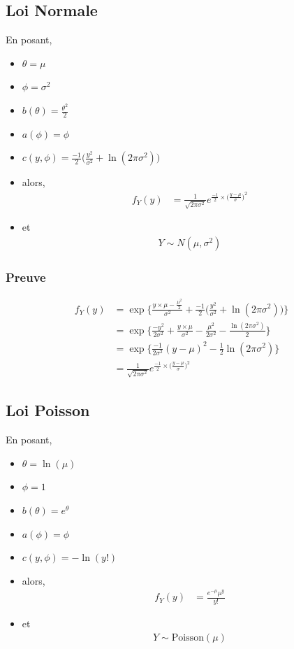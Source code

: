 \documentclass[11pt,french]{report}
\newcommand{\fact}[1]{#1\mathpunct{}!}
\begin{document}
\subsection{Loi Normale}
En posant,
\begin{itemize}
     \item $\theta = \mu$
     \item $\phi = \sigma^2$
     \item $b(\theta) = \frac{\theta^2}{2}$
     \item $a(\phi) = \phi$
     \item $c(y, \phi) = \frac{-1}{2}\bigg(\frac{y^2}{\sigma^2} + \ln(2 \pi \sigma^2) \bigg)$
     \item[] alors,
     \begin{align*}
          f_Y(y) &= \frac{1}{\sqrt{2 \pi \sigma^2}}e^{\frac{-1}{2}\times \big(\frac{y - \mu}{\sigma} \big)^2}
     \end{align*}
     \item[] et
     \begin{align*}
          Y \sim N(\mu, \sigma^2)
     \end{align*}
\end{itemize}

\subsubsection*{Preuve}
\begin{align*}
f_Y(y) &= \exp\Bigg\lbrace \frac{y \times \mu - \frac{\mu^2}{2}}{\sigma^2} + \frac{-1}{2} \bigg( \frac{y^2}{\sigma^2} + \ln(2 \pi \sigma^2) \bigg) \Bigg\rbrace \\
&= \exp\Bigg\lbrace \frac{-y^2}{2\sigma^2} + \frac{y \times \mu}{\sigma^2} - \frac{\mu^2}{2\sigma^2} - \frac{\ln(2 \pi \sigma^2)}{2} \Bigg\rbrace \\
&= \exp\Bigg\lbrace \frac{-1}{2\sigma^2}(y - \mu)^2 - \frac{1}{2} \ln(2\pi \sigma^2)\Bigg\rbrace \\
&= \frac{1}{\sqrt{2 \pi \sigma^2}}e^{\frac{-1}{2}\times \big(\frac{y - \mu}{\sigma} \big)^2}
\end{align*}

\subsection{Loi Poisson}
En posant,
\begin{itemize}
     \item $\theta = \ln(\mu)$
     \item $\phi = 1$
     \item $b(\theta) = e^{\theta}$
     \item $a(\phi) = \phi$
     \item $c(y, \phi) = -\ln(\fact{y})$
     \item[] alors,
     \begin{align*}
          f_Y(y) &= \frac{e^{-\mu}\mu^y}{\fact{y}}
     \end{align*}
     \item[] et
     \begin{align*}
          Y \sim \text{Poisson}(\mu)
     \end{align*}
\end{itemize}
\end{document}
